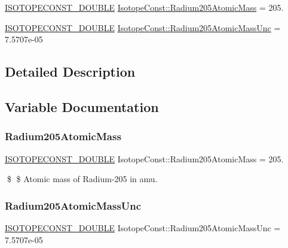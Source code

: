 \begin{DoxyCompactItemize}
\item 
\mbox{\hyperlink{group___isotope_const-_macros_ga8f45a7272ce02c0b4c65c44636ed719a}{I\+S\+O\+T\+O\+P\+E\+C\+O\+N\+S\+T\+\_\+\+D\+O\+U\+B\+LE}} \mbox{\hyperlink{group___isotope_const-_radium-_ra205_ga63c2b7a59a397b9612d79b0d1f7c04fa}{Isotope\+Const\+::\+Radium205\+Atomic\+Mass}} = 205.
\item 
\mbox{\hyperlink{group___isotope_const-_macros_ga8f45a7272ce02c0b4c65c44636ed719a}{I\+S\+O\+T\+O\+P\+E\+C\+O\+N\+S\+T\+\_\+\+D\+O\+U\+B\+LE}} \mbox{\hyperlink{group___isotope_const-_radium-_ra205_gafdf5474ca3633692f75b9ae1508b1b8e}{Isotope\+Const\+::\+Radium205\+Atomic\+Mass\+Unc}} = 7.\+5707e-\/05
\end{DoxyCompactItemize}


\subsection{Detailed Description}


\subsection{Variable Documentation}
\mbox{\label{group___isotope_const-_radium-_ra205_ga63c2b7a59a397b9612d79b0d1f7c04fa}} 
\subsubsection{\texorpdfstring{Radium205\+Atomic\+Mass}{Radium205AtomicMass}}
{\footnotesize\ttfamily \mbox{\hyperlink{group___isotope_const-_macros_ga8f45a7272ce02c0b4c65c44636ed719a}{I\+S\+O\+T\+O\+P\+E\+C\+O\+N\+S\+T\+\_\+\+D\+O\+U\+B\+LE}} Isotope\+Const\+::\+Radium205\+Atomic\+Mass = 205.}

\$ \$ Atomic mass of Radium-\/205 in amu. \mbox{\label{group___isotope_const-_radium-_ra205_gafdf5474ca3633692f75b9ae1508b1b8e}} 
\subsubsection{\texorpdfstring{Radium205\+Atomic\+Mass\+Unc}{Radium205AtomicMassUnc}}
{\footnotesize\ttfamily \mbox{\hyperlink{group___isotope_const-_macros_ga8f45a7272ce02c0b4c65c44636ed719a}{I\+S\+O\+T\+O\+P\+E\+C\+O\+N\+S\+T\+\_\+\+D\+O\+U\+B\+LE}} Isotope\+Const\+::\+Radium205\+Atomic\+Mass\+Unc = 7.\+5707e-\/05}

